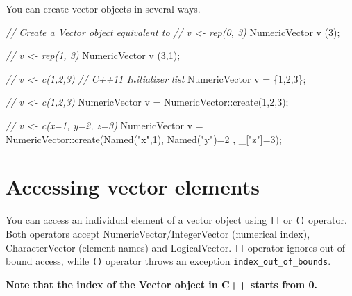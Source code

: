 \documentclass[]{book}
\newenvironment{Shaded}{\begin{snugshade}}{\end{snugshade}}
\newcommand{\CommentTok}[1]{\textcolor[rgb]{0.56,0.35,0.01}{\textit{#1}}}
\newcommand{\DecValTok}[1]{\textcolor[rgb]{0.00,0.00,0.81}{#1}}
\newcommand{\NormalTok}[1]{#1}
\newcommand{\StringTok}[1]{\textcolor[rgb]{0.31,0.60,0.02}{#1}}
\begin{document}
You can create vector objects in several ways.

\begin{Shaded}
\begin{Highlighting}[]
\CommentTok{// Create a Vector object equivalent to}
\CommentTok{// v <- rep(0, 3)}
\NormalTok{NumericVector v (}\DecValTok{3}\NormalTok{);}

\CommentTok{// v <- rep(1, 3)}
\NormalTok{NumericVector v (}\DecValTok{3}\NormalTok{,}\DecValTok{1}\NormalTok{);}

\CommentTok{// v <- c(1,2,3) }
\CommentTok{// C++11 Initializer list}
\NormalTok{NumericVector v = \{}\DecValTok{1}\NormalTok{,}\DecValTok{2}\NormalTok{,}\DecValTok{3}\NormalTok{\}; }

\CommentTok{// v <- c(1,2,3)}
\NormalTok{NumericVector v = NumericVector::create(}\DecValTok{1}\NormalTok{,}\DecValTok{2}\NormalTok{,}\DecValTok{3}\NormalTok{);}

\CommentTok{// v <- c(x=1, y=2, z=3)}
\NormalTok{NumericVector v =}
\NormalTok{  NumericVector::create(Named(}\StringTok{"x"}\NormalTok{,}\DecValTok{1}\NormalTok{), Named(}\StringTok{"y"}\NormalTok{)=}\DecValTok{2}\NormalTok{ , _[}\StringTok{"z"}\NormalTok{]=}\DecValTok{3}\NormalTok{);}
\end{Highlighting}
\end{Shaded}

\hypertarget{accessing-vector-elements}{%
\section{Accessing vector elements}\label{accessing-vector-elements}}

You can access an individual element of a vector object using \texttt{{[}{]}} or \texttt{()} operator. Both operators accept NumericVector/IntegerVector (numerical index), CharacterVector (element names) and LogicalVector. \texttt{{[}{]}} operator ignores out of bound access, while \texttt{()} operator throws an exception \texttt{index\_out\_of\_bounds}.

\textbf{Note that the index of the Vector object in C++ starts from 0.}
\end{document}

